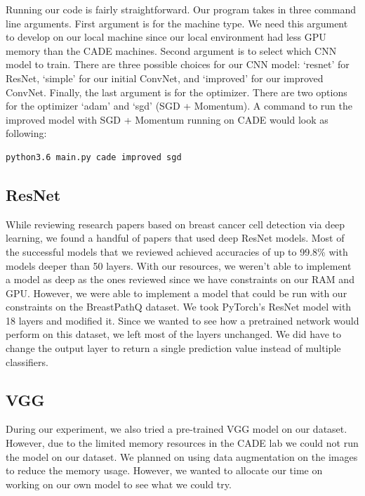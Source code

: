 \documentclass[11pt]{ieeeconf}
\begin{document}
Running our code is fairly straightforward. Our program takes in three command line arguments. First argument is for the machine type. We need this argument to develop on our local machine since our local environment had less GPU memory than the CADE machines. Second argument is to select which CNN model to train. There are three possible choices for our CNN model: ‘resnet’ for ResNet, ‘simple’ for our initial ConvNet, and ‘improved’ for our improved ConvNet. Finally, the last argument is for the optimizer. There are two options for the optimizer ‘adam’ and ‘sgd’ (SGD + Momentum). A command to run the improved model with SGD + Momentum running on CADE would look as following:

\begin{lstlisting}
python3.6 main.py cade improved sgd
\end{lstlisting}

\subsection{ResNet}
While reviewing research papers based on breast cancer cell detection via deep learning, we found a handful of papers that used deep ResNet models. Most of the successful models that we reviewed achieved accuracies of up to 99.8\% with models deeper than 50 layers. With our resources, we weren’t able to implement a model as deep as the ones reviewed since we have constraints on our RAM and GPU. However, we were able to implement a model that could be run with our constraints on the BreastPathQ dataset.
We took PyTorch’s ResNet model with 18 layers and modified it. Since we wanted to see how a pretrained network would perform on this dataset, we left most of the layers unchanged. We did have to change the output layer to return a single prediction value instead of multiple classifiers. 

\subsection{VGG}
During our experiment, we also tried a pre-trained VGG model on our dataset. However, due to the limited memory resources in the CADE lab we could not run the model on our dataset. We planned on using data augmentation on the images to reduce the memory usage. However, we wanted to allocate our time on working on our own model to see what we could try.
\end{document}
